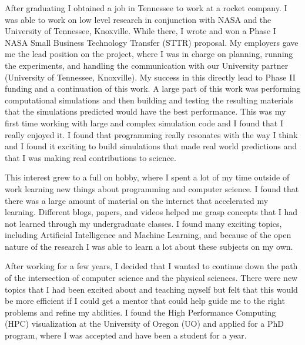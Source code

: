 \documentclass[12pt]{article}
\begin{document}
After graduating I obtained a job in Tennessee to work at a rocket company.
I was able to work on low level research in conjunction with NASA and the
University of Tennessee, Knoxville. While there, I wrote and won a Phase I NASA
Small Business Technology Transfer (STTR) proposal. My employers gave me the
lead position on the project, where I was in charge on planning, running the
experiments, and handling the communication with our University partner
(University of Tennessee, Knoxville). My success in this directly lead to Phase
II funding and a continuation of this work. A large part of this work was
performing computational simulations and then building and testing the resulting
materials that the simulations predicted would have the best performance. This
was my first time working with large and complex simulation code and I found
that I really enjoyed it. I found that programming really resonates with the way
I think and I found it exciting to build simulations that made real world
predictions and that I was making real contributions to science. 

This interest grew to a full on hobby, where I spent a lot of my time outside of
work learning new things about programming and computer science. I found that
there was a large amount of material on the internet that accelerated my
learning. Different blogs, papers, and videos helped me grasp concepts that I
had not learned through my undergraduate classes. I found many exciting topics,
including Artificial Intelligence and Machine Learning, and because of the open
nature of the research I was able to learn a lot about these subjects on my own.

After working for a few years, I decided that I wanted to continue down the path
of the intersection of computer science and the physical sciences. There were
new topics that I had been excited about and teaching myself but felt that this
would be more efficient if I could get a mentor that could help guide me to the
right problems and refine my abilities. I found the High Performance Computing
(HPC) visualization at the University of Oregon (UO) and applied for a PhD
program, where I was accepted and have been a student for a year. 
\end{document}
